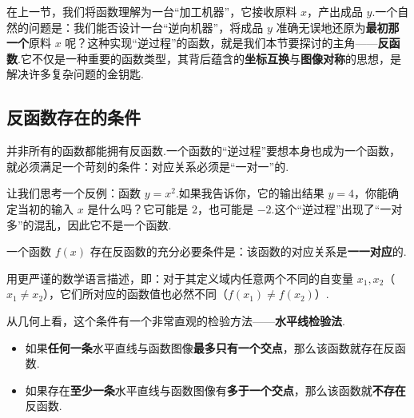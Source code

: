在上一节，我们将函数理解为一台“加工机器”，它接收原料 $x$，产出成品 $y$.一个自然的问题是：我们能否设计一台“逆向机器”，将成品 $y$ 准确无误地还原为\textbf{最初那一个}原料 $x$ 呢？这种实现“逆过程”的函数，就是我们本节要探讨的主角——\textbf{反函数}.它不仅是一种重要的函数类型，其背后蕴含的\textbf{坐标互换}与\textbf{图像对称}的思想，是解决许多复杂问题的金钥匙.


\subsection{反函数存在的条件}

并非所有的函数都能拥有反函数.一个函数的“逆过程”要想本身也成为一个函数，就必须满足一个苛刻的条件：对应关系必须是“一对一”的.

让我们思考一个反例：函数 $y=x^2$.如果我告诉你，它的输出结果 $y=4$，你能确定当初的输入 $x$ 是什么吗？它可能是 $2$，也可能是 $-2$.这个“逆过程”出现了“一对多”的混乱，因此它不是一个函数.

\begin{theorem}[反函数存在的充要条件]
	一个函数 $f(x)$ 存在反函数的充分必要条件是：该函数的对应关系是\textbf{一一对应}的.
	
	用更严谨的数学语言描述，即：对于其定义域内任意两个不同的自变量 $x_1, x_2$（$x_1 \neq x_2$），它们所对应的函数值也必然不同（$f(x_1) \neq f(x_2)$）.
\end{theorem}

\begin{note}[水平线检验法]
	从几何上看，这个条件有一个非常直观的检验方法——\textbf{水平线检验法}.
	\begin{itemize}
		\item 如果\textbf{任何一条}水平直线与函数图像\textbf{最多只有一个交点}，那么该函数就存在反函数.
		\item 如果存在\textbf{至少一条}水平直线与函数图像有\textbf{多于一个交点}，那么该函数就\textbf{不存在}反函数.
	\end{itemize}
\end{note}


